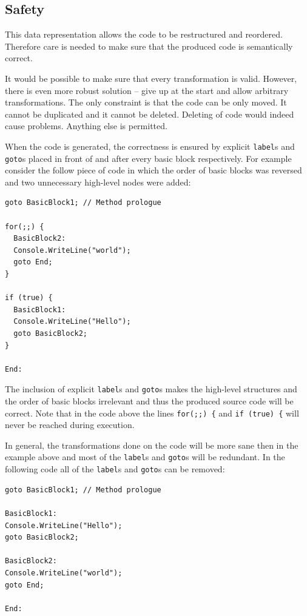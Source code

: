 \documentclass[12pt,twoside,notitlepage]{report}
\begin{document}
\subsection{Safety}
This data representation allows the code to be restructured
and reordered.  Therefore care is needed to make sure that
the produced code is semantically correct.

It would be possible to make sure that every transformation is 
valid.  However, there is even more robust solution --
give up at the start and allow arbitrary transformations.
The only constraint is that the code can be only moved.  It cannot
be duplicated and it cannot be deleted.  Deleting of code would
indeed cause problems.  Anything else is permitted.

When the code is generated, the correctness is ensured by
explicit \verb|label|s and \verb|goto|s placed in front
of and after every basic block respectively.  For example
consider the follow piece of code in which the order of
basic blocks was reversed and two unnecessary high-level 
nodes were added:

\begin{verbatim}
goto BasicBlock1; // Method prologue

for(;;) {
  BasicBlock2:
  Console.WriteLine("world");
  goto End;
}

if (true) {
  BasicBlock1:
  Console.WriteLine("Hello");
  goto BasicBlock2;
}

End:
\end{verbatim}

The inclusion of explicit \verb|label|s and \verb|goto|s
makes the high-level structures and the order of basic blocks
irrelevant and thus the produced source code will be correct.
Note that in the code above the lines \verb|for(;;) {| and 
\verb|if (true) {| will never be reached during execution.

In general, the transformations done on the code will be
more sane then in the example above and most of the
\verb|label|s and \verb|goto|s will be redundant.
In the following code all of the \verb|label|s and \verb|goto|s
can be removed:

\begin{verbatim}
goto BasicBlock1; // Method prologue

BasicBlock1:
Console.WriteLine("Hello");
goto BasicBlock2;

BasicBlock2:
Console.WriteLine("world");
goto End;

End:
\end{verbatim}
\end{document}
